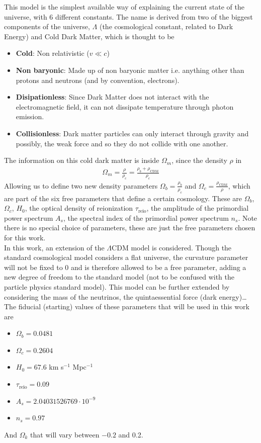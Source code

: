 This model is the simplest available way of explaining the current state of the universe, with 6 different constants. The name is derived from two of the biggest components of the universe, $\Lambda$ (the cosmological constant, related to Dark Energy) and Cold Dark Matter, which is thought to be
\begin{itemize}
	\item \textbf{Cold}: Non relativistic ($v \ll c$)
	\item \textbf{Non baryonic}: Made up of non baryonic matter i.e. anything other than protons and neutrons (and by convention, electrons).
	\item \textbf{Disipationless}: Since Dark Matter does not interact with the electromagnetic field, it can not dissipate temperature through photon emission.
	\item \textbf{Collisionless}: Dark matter particles can only interact through gravity and possibly, the weak force and so they do not collide with one another.
\end{itemize}
The information on this cold dark matter is inside $\Omega_m$, since the density $\rho$ in
\begin{align}
	\Omega_m = \frac{\rho}{\rho_c} = \frac{\rho_b + \rho_{\text{CDM}}}{\rho_c}
\end{align}
Allowing us to define two new density parameters $\Omega_b = \frac{\rho_b}{\rho_c}$ and $\Omega_c =  \frac{\rho_\text{CDM}}{\rho}$, which are part of the six free parameters that define a certain cosmology. These are $\Omega_b$, $\Omega_c$, $H_0$, the optical density of reionization $\tau_{\text{reio}}$, the amplitude of the primordial power spectrum $A_s$, the spectral index of the primordial power spectrum $n_s$. Note there is no special choice of parameters, these are just the free parameters chosen for this work. \\

In this work, an extension of the $\Lambda$CDM model is considered. Though the standard cosmological model considers a flat universe, the curvature parameter will not be fixed to $0$ and is therefore allowed to be a free parameter, adding a new degree of freedom to the standard model (not to be confused with the particle physics standard model). This model can be further extended by considering the mass of the neutrinos, the quintaessential force (dark energy)\ldots  \\

The fiducial (starting) values of these parameters that will be used in this work are
\begin{itemize}
	\item 	$\Omega_b =  0.0481 $
	\item 	$\Omega_c =  0.2604$ 
	\item $H_0 = 67.6$ km s$ ^{-1}$ Mpc$^{-1}$
	\item $\tau_{\text{reio}} = 0.09$
	\item $A_s = 2.04031526769\cdot 10^{-9}$
	\item $n_s = 0.97$
\end{itemize}
And $\Omega _k$ that will vary between $-0.2$ and 0.2.

